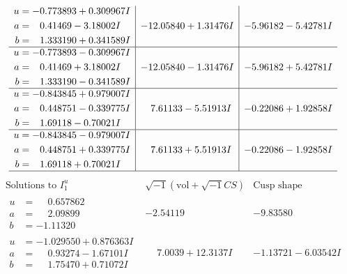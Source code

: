 \documentclass[1p]{elsarticle_modified}
\theoremstyle{definition}
\newcommand{\I}{\sqrt{-1}}
\begin{document}
$$\begin{array}{c|c|c}
\begin{aligned}
u &= -0.773893 + 0.309967 I \\
a &= \phantom{-}0.41469 - 3.18002 I \\
b &= \phantom{-}1.333190 + 0.341589 I\end{aligned}
 & -12.05840 + 1.31476 I & -5.96182 - 5.42781 I \\ \hline\begin{aligned}
u &= -0.773893 - 0.309967 I \\
a &= \phantom{-}0.41469 + 3.18002 I \\
b &= \phantom{-}1.333190 - 0.341589 I\end{aligned}
 & -12.05840 - 1.31476 I & -5.96182 + 5.42781 I \\ \hline\begin{aligned}
u &= -0.843845 + 0.979007 I \\
a &= \phantom{-}0.448751 - 0.339775 I \\
b &= \phantom{-}1.69118 - 0.70021 I\end{aligned}
 & \phantom{-}7.61133 - 5.51913 I & -0.22086 + 1.92858 I \\ \hline\begin{aligned}
u &= -0.843845 - 0.979007 I \\
a &= \phantom{-}0.448751 + 0.339775 I \\
b &= \phantom{-}1.69118 + 0.70021 I\end{aligned}
 & \phantom{-}7.61133 + 5.51913 I & -0.22086 - 1.92858 I\\
 \hline 
 \end{array}$$\newpage$$\begin{array}{c|c|c}  
\text{Solutions to }I^u_{1}& \I (\text{vol} + \sqrt{-1}CS) & \text{Cusp shape}\\
 \hline 
\begin{aligned}
u &= \phantom{-}0.657862\phantom{ +0.000000I} \\
a &= \phantom{-}2.09899\phantom{ +0.000000I} \\
b &= -1.11320\phantom{ +0.000000I}\end{aligned}
 & -2.54119\phantom{ +0.000000I} & -9.83580\phantom{ +0.000000I} \\ \hline\begin{aligned}
u &= -1.029550 + 0.876363 I \\
a &= \phantom{-}0.93274 - 1.67101 I \\
b &= \phantom{-}1.75470 + 0.71072 I\end{aligned}
 & \phantom{-}7.0039 + 12.3137 I & -1.13721 - 6.03542 I \\ \hline\begin{aligned}

\end{aligned}
\end{array}$$
\end{document}

